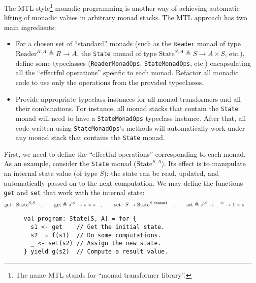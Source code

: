 The MTL-style\footnote{The name MTL stands for \textsf{``}monad transformer library\textsf{''}.}
monadic programming is another way
of achieving automatic lifting of monadic values in arbitrary monad
stacks. The MTL approach has two main ingredients:
\begin{itemize}
\item For a chosen set of \textsf{``}standard\textsf{''} monads (such as the \lstinline!Reader!
monad of type $\text{Reader}^{R,A}\triangleq R\rightarrow A$, the
\lstinline!State! monad of type $\text{State}^{S,A}\triangleq S\rightarrow A\times S$,
etc.), define some typeclasses (\lstinline!ReaderMonadOps!, \lstinline!StateMonadOps!,
etc.) encapsulating all the \textsf{``}effectful operations\textsf{''} specific to
each monad. Refactor all monadic code to use only the operations from
the provided typeclasses. 
\item Provide appropriate typeclass instances for all monad transformers
and all their combinations. For instance, all monad stacks that contain
the \lstinline!State! monad will need to have a \lstinline!StateMonadOps!
typeclass instance. After that, all code written using \lstinline!StateMonadOps!\textsf{'}s
methods will automatically work under any monad stack that contains
the \lstinline!State! monad. 
\end{itemize}
First, we need to define the \textsf{``}effectful operations\textsf{''} corresponding
to each monad. As an example, consider the \lstinline!State! monad
($\text{State}^{S,A}$). Its effect is to manipulate an internal state
value (of type $S$): the state can be read, updated, and automatically
passed on to the next computation. We may define the functions \lstinline!get!
and \lstinline!set! that work with the internal state:
\[
\text{get}:\text{State}^{S,S}\quad,\quad\quad\text{get}\triangleq s^{:S}\rightarrow s\times s\quad,\quad\quad\text{set}:S\rightarrow\text{State}^{S,\bbnum 1}\quad,\quad\quad\text{set}\triangleq s^{:S}\rightarrow\_^{:S}\rightarrow1\times s\quad.
\]

\begin{wrapfigure}{l}{0.43\columnwidth}%
\vspace{-1\baselineskip}

\begin{lstlisting}
val program: State[S, A] = for {
  s1 <- get    // Get the initial state.
  s2  = f(s1)  // Do some computations.
  _ <- set(s2) // Assign the new state.
} yield g(s2)  // Compute a result value.
\end{lstlisting}
\vspace{-0.8\baselineskip}
\end{wrapfigure}%

